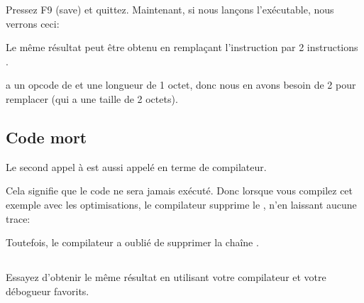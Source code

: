 Pressez F9 (save) et quittez. Maintenant, si nous lançons l'exécutable, nous verrons
ceci:



Le même résultat peut être obtenu en remplaçant l'instruction \JMP par 2 instructions
\NOP.

\NOP a un opcode de  et une longueur de 1 octet, donc nous en avons besoin
de 2 pour remplacer \JMP (qui a une taille de 2 octets).

\subsection{Code mort}

Le second appel à \printf est aussi appelé  en terme de compilateur.

Cela signifie que le code ne sera jamais exécuté.
Donc lorsque vous compilez cet exemple avec les optimisations, le compilateur supprime
le , n'en laissant aucune trace:



Toutefois, le compilateur a oublié de supprimer la chaîne .


\subsection{\Exercise}


Essayez d'obtenir le même résultat en utilisant votre compilateur et votre débogueur
favorits.

